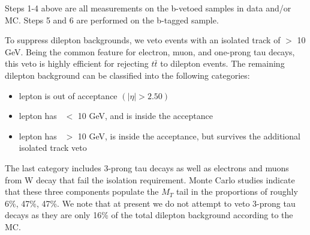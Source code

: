 Steps 1-4 above are all measurements on the b-vetoed samples in data and/or MC. Steps 5 and 6 are performed on the b-tagged sample.

To suppress dilepton backgrounds, we veto events with an isolated track of \pt $>$ 10 GeV. 
Being the common feature for electron, muon, and one-prong
tau decays, this veto is highly efficient for rejecting 
$t\bar{t}$ to dilepton events. The remaining dilepton background can be classified into the following categories:

\begin{itemize}
\item lepton is out of acceptance $(|\eta| > 2.50)$
\item lepton has \pt\ $<$ 10 GeV, and is inside the acceptance
\item lepton has \pt\ $>$ 10 GeV, is inside the acceptance, but survives the additional isolated track veto
\end{itemize}


The last category includes 3-prong tau decays as well as electrons and muons from W decay that fail the isolation requirement.
Monte Carlo studies indicate that these three components populate the $M_T$ tail in the proportions of roughly  6\%, 47\%, 47\%. 
We note that at present we do not attempt to veto 3-prong tau decays as they are only 16\% of the total dilepton background according to the MC.

